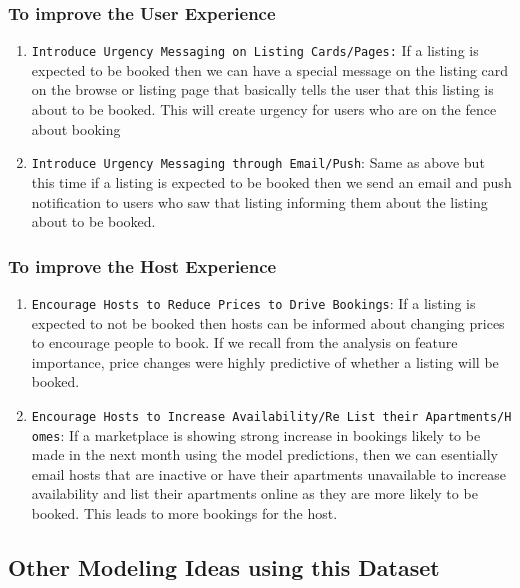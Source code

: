 \documentclass[11pt]{article}
\begin{document}
\subsubsection{To improve the User
Experience}\label{to-improve-the-user-experience}

\begin{enumerate}
\def\labelenumi{\arabic{enumi})}
\item
  \texttt{Introduce\ Urgency\ Messaging\ on\ Listing\ Cards/Pages:} If a
  listing is expected to be booked then we can have a special message on
  the listing card on the browse or listing page that basically tells
  the user that this listing is about to be booked. This will create
  urgency for users who are on the fence about booking
\item
  \texttt{Introduce\ Urgency\ Messaging\ through\ Email/Push}: Same as
  above but this time if a listing is expected to be booked then we send
  an email and push notification to users who saw that listing informing
  them about the listing about to be booked.
\end{enumerate}

\subsubsection{To improve the Host
Experience}\label{to-improve-the-host-experience}

\begin{enumerate}
\def\labelenumi{\arabic{enumi})}
\item
  \texttt{Encourage\ Hosts\ to\ Reduce\ Prices\ to\ Drive\ Bookings}: If
  a listing is expected to not be booked then hosts can be informed
  about changing prices to encourage people to book. If we recall from
  the analysis on feature importance, price changes were highly
  predictive of whether a listing will be booked.
\item
  \texttt{Encourage\ Hosts\ to\ Increase\ Availability/Re\ List\ their\ Apartments/Homes}:
  If a marketplace is showing strong increase in bookings likely to be
  made in the next month using the model predictions, then we can
  esentially email hosts that are inactive or have their apartments
  unavailable to increase availability and list their apartments online
  as they are more likely to be booked. This leads to more bookings for
  the host.
\end{enumerate}

    \subsection{Other Modeling Ideas using this
Dataset}\label{other-modeling-ideas-using-this-dataset}


    
    
    
    
\end{document}
